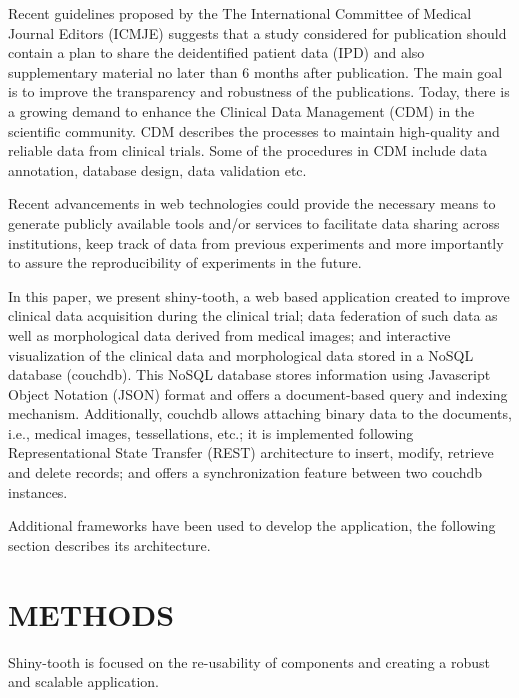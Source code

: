 \documentclass[]{spie}  %
\begin{document}
Recent guidelines proposed by the The International Committee of Medical Journal Editors (ICMJE) suggests that a study considered for publication should 
contain a plan to share the deidentified patient data (IPD) and also supplementary material no later than 6 months 
after publication\cite{doi:10.1001/jama.2015.18164}. The main goal is to improve the transparency and robustness of the publications. 
Today, there is a growing demand to enhance the Clinical Data Management (CDM) \cite{krishnankutty_data_2012} in the scientific community. 
CDM describes the processes to maintain high-quality and reliable data from clinical trials.  
Some of the procedures in CDM include data annotation, database design, data validation etc. 

Recent advancements in web technologies could provide the necessary means to generate publicly available tools and/or services to 
facilitate data sharing across institutions, keep track of data from previous experiments and more importantly to 
assure the reproducibility of experiments in the future.

In this paper, we present shiny-tooth, a web based application created to improve clinical data acquisition during the clinical trial; 
data federation of such data as well as morphological data derived from medical images; and interactive visualization 
of the clinical data and morphological data stored in a NoSQL database (couchdb). This NoSQL database stores information using Javascript Object Notation 
(JSON) format and offers a document-based query and indexing mechanism. Additionally, couchdb allows attaching binary data to the documents, i.e., medical images, tessellations, etc.; it is implemented following Representational State Transfer (REST) architecture to insert, modify, retrieve and delete records; 
and offers a synchronization feature between two couchdb instances.


Additional frameworks have been used to develop the application, the following section describes its architecture. 

\section{METHODS} 
\label{sec:METHODS}

Shiny-tooth is focused on the re-usability of components and creating a robust and scalable application. 
\end{document}
